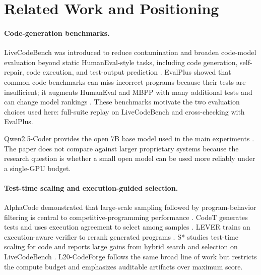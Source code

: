 \documentclass[11pt]{article}
\begin{document}
\section{Related Work and Positioning}

\paragraph{Code-generation benchmarks.}
LiveCodeBench was introduced to reduce contamination and broaden code-model
evaluation beyond static HumanEval-style tasks, including code generation,
self-repair, code execution, and test-output prediction
\citep{jain2024livecodebench}. EvalPlus showed that common code benchmarks can
miss incorrect programs because their tests are insufficient; it augments
HumanEval and MBPP with many additional tests and can change model rankings
\citep{liu2023evalplus}. These benchmarks motivate the two evaluation choices
used here: full-suite replay on LiveCodeBench and cross-checking with EvalPlus.

Qwen2.5-Coder provides the open 7B base model used in the main experiments
\citep{qwen2024coder}. The paper does not compare against larger proprietary
systems because the research question is whether a small open model can be used
more reliably under a single-GPU budget.

\paragraph{Test-time scaling and execution-guided selection.}
AlphaCode demonstrated that large-scale sampling followed by program-behavior
filtering is central to competitive-programming performance
\citep{li2022alphacode}. CodeT generates tests and uses execution agreement to
select among samples \citep{chen2022codet}. LEVER trains an execution-aware
verifier to rerank generated programs \citep{ni2023lever}. S* studies
test-time scaling for code and reports large gains from hybrid search and
selection on LiveCodeBench \citep{li2025sstar}. L20-CodeForge follows the
same broad line of work but restricts the compute budget and emphasizes
auditable artifacts over maximum score.
\end{document}
